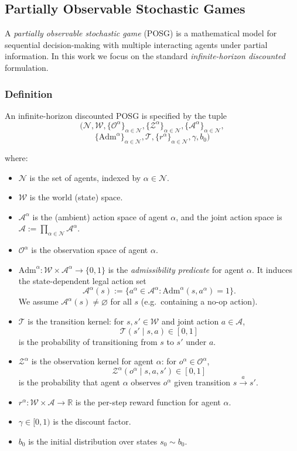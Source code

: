 \documentclass[letterpaper]{article} %
\begin{document}
\subsection{Partially Observable Stochastic Games}

A \emph{partially observable stochastic game} (POSG) is a mathematical model for sequential decision-making with multiple interacting agents under partial information. In this work we focus on the standard \emph{infinite-horizon discounted} formulation.
\subsubsection{Definition}

An infinite-horizon discounted POSG is specified by the tuple
\[
\Big(\mathcal{N}, \mathcal{W},\{\mathcal{O}^\alpha\}_{\alpha\in \mathcal{N}},\{\mathcal{Z}^\alpha\}_{\alpha\in \mathcal{N}},
\{\mathcal{A}^\alpha\}_{\alpha\in \mathcal{N}},\]\[\{\mathrm{Adm}^\alpha\}_{\alpha\in\mathcal{N}},\mathcal{T},
\{r^\alpha\}_{\alpha\in \mathcal{N}},\gamma,b_0\Big)    
\]

where:
\begin{itemize}
    \item $\mathcal{N}$ is the set of agents, indexed by $\alpha\in \mathcal{N}$.
    \item $\mathcal{W}$ is the world (state) space.
    \item $\mathcal{A}^\alpha$ is the (ambient) action space of agent $\alpha$, and the joint action space is
    $\mathcal{A}:=\prod_{\alpha\in \mathcal{N}}\mathcal{A}^\alpha$.
    \item $\mathcal{O}^\alpha$ is the observation space of agent $\alpha$.
    \item $\mathrm{Adm}^\alpha:\mathcal{W}\times \mathcal{A}^\alpha\to\{0,1\}$ is the \emph{admissibility predicate} for agent $\alpha$.
    It induces the state-dependent legal action set
    \[
    \mathcal{A}^\alpha(s) := \{a^\alpha\in\mathcal{A}^\alpha : \mathrm{Adm}^\alpha(s,a^\alpha)=1\}.
    \]
    We assume $\mathcal{A}^\alpha(s)\neq\varnothing$ for all $s$ (e.g.\ containing a no-op action).
    \item $\mathcal{T}$ is the transition kernel: for $s,s'\in \mathcal{W}$ and joint action $a\in\mathcal{A}$,
    \[
    \mathcal{T}(s' \mid s,a)\in[0,1]
    \]
    is the probability of transitioning from $s$ to $s'$ under $a$.
    \item $\mathcal{Z}^\alpha$ is the observation kernel for agent $\alpha$: for $o^\alpha\in\mathcal{O}^\alpha$,
    \[
    \mathcal{Z}^\alpha(o^\alpha \mid s,a,s')\in[0,1]
    \]
    is the probability that agent $\alpha$ observes $o^\alpha$ given transition $s\xrightarrow{a}s'$.
    \item $r^\alpha:\mathcal{W}\times \mathcal{A}\to \mathbb{R}$ is the per-step reward function for agent $\alpha$.
    \item $\gamma\in[0,1)$ is the discount factor.
    \item $b_0$ is the initial distribution over states $s_0\sim b_0$.
\end{itemize}
\end{document}
